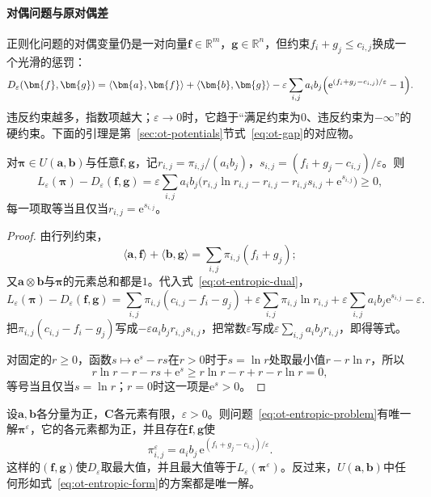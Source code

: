 \paragraph{对偶问题与原对偶差}
正则化问题的对偶变量仍是一对向量$\bm{f}\in\mathbb{R}^{m}$，$\bm{g}\in\mathbb{R}^{n}$，但约束$f_i+g_j\leq c_{i,j}$换成一个光滑的惩罚：
\begin{equation}
 D_\varepsilon(\bm{f},\bm{g})=\langle\bm{a},\bm{f}\rangle+\langle\bm{b},\bm{g}\rangle-\varepsilon\sum_{i,j}a_ib_j\Bigl(\mathrm{e}^{(f_i+g_j-c_{i,j})/\varepsilon}-1\Bigr).
 \label{eq:ot-entropic-dual}
\end{equation}
违反约束越多，指数项越大；$\varepsilon\to0$时，它趋于“满足约束为$0$、违反约束为$-\infty$”的硬约束。下面的引理是第~\ref{sec:ot-potentials}节式~\eqref{eq:ot-gap}的对应物。

\begin{lemma}[正则化问题的原对偶差]
\label{lem:ot-entropic-gap}
对$\bm{\pi}\in U(\bm{a},\bm{b})$与任意$\bm{f},\bm{g}$，记$r_{i,j}=\pi_{i,j}/(a_ib_j)$，$s_{i,j}=(f_i+g_j-c_{i,j})/\varepsilon$。则
\begin{equation}
 L_\varepsilon(\bm{\pi})-D_\varepsilon(\bm{f},\bm{g})=\varepsilon\sum_{i,j}a_ib_j\bigl(r_{i,j}\ln r_{i,j}-r_{i,j}-r_{i,j}s_{i,j}+\mathrm{e}^{s_{i,j}}\bigr)\geq0 ,
 \label{eq:ot-entropic-gap}
\end{equation}
每一项取等当且仅当$r_{i,j}=\mathrm{e}^{s_{i,j}}$。
\end{lemma}

\begin{proof}
由行列约束，
\[
 \langle\bm{a},\bm{f}\rangle+\langle\bm{b},\bm{g}\rangle=\sum_{i,j}\pi_{i,j}(f_i+g_j);
\]
又$\bm{a}\otimes\bm{b}$与$\bm{\pi}$的元素总和都是$1$。代入式~\eqref{eq:ot-entropic-dual}，
\[
 L_\varepsilon(\bm{\pi})-D_\varepsilon(\bm{f},\bm{g})=\sum_{i,j}\pi_{i,j}(c_{i,j}-f_i-g_j)+\varepsilon\sum_{i,j}\pi_{i,j}\ln r_{i,j}+\varepsilon\sum_{i,j}a_ib_j\mathrm{e}^{s_{i,j}}-\varepsilon .
\]
把$\pi_{i,j}(c_{i,j}-f_i-g_j)$写成$-\varepsilon a_ib_jr_{i,j}s_{i,j}$，把常数$\varepsilon$写成$\varepsilon\sum_{i,j}a_ib_jr_{i,j}$，即得等式。

对固定的$r\geq0$，函数$s\mapsto\mathrm{e}^{s}-rs$在$r>0$时于$s=\ln r$处取最小值$r-r\ln r$，所以
\[
 r\ln r-r-rs+\mathrm{e}^{s}\geq r\ln r-r+r-r\ln r=0 ,
\]
等号当且仅当$s=\ln r$；$r=0$时这一项是$\mathrm{e}^{s}>0$。
\end{proof}

\begin{theorem}[熵正则化问题的解]
\label{thm:ot-entropic-solution}
设$\bm{a},\bm{b}$各分量为正，$\bm{C}$各元素有限，$\varepsilon>0$。则问题~\eqref{eq:ot-entropic-problem}有唯一解$\bm{\pi}^{\varepsilon}$，它的各元素都为正，并且存在$\bm{f},\bm{g}$使
\begin{equation}
 \pi^{\varepsilon}_{i,j}=a_ib_j\,\mathrm{e}^{(f_i+g_j-c_{i,j})/\varepsilon}.
 \label{eq:ot-entropic-form}
\end{equation}
这样的$(\bm{f},\bm{g})$使$D_\varepsilon$取最大值，并且最大值等于$L_\varepsilon(\bm{\pi}^{\varepsilon})$。反过来，$U(\bm{a},\bm{b})$中任何形如式~\eqref{eq:ot-entropic-form}的方案都是唯一解。
\end{theorem}

